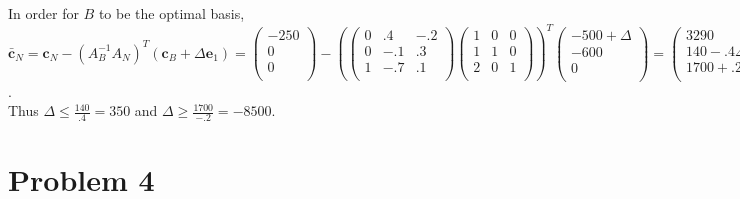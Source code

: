 \documentclass{article}
\begin{document}
In order for $B$ to be the optimal basis,\\ $\bar{\mathbf{c}}_N = \mathbf{c}_N - (A_B^{-1}A_N)^T(\mathbf{c}_B + \Delta \mathbf{e}_1) = \left( \begin{array}{c} -250\\ 0\\ 0\\ \end{array} \right) - (\left( \begin{array}{ccc} 0 & .4 & -.2\\ 0 & -.1 & .3\\ 1 & -.7 & .1\\ \end{array} \right) \left( \begin{array}{ccc} 1 & 0 & 0\\ 1 & 1 & 0\\ 2 & 0 & 1\\ \end{array} \right))^T \left( \begin{array}{c} -500 + \Delta \\ -600\\ 0\\ \end{array} \right) = \left( \begin{array}{c} 3290\\ 140 - .4 \Delta \\ 1700 + .2 \Delta \\ \end{array} \right)\ge \mathbf{0}$.\\
Thus $\Delta \le \frac{140}{.4} = 350$ and $\Delta \ge \frac{1700}{-.2} = -8500$. 

\section{Problem 4}
\end{document}
